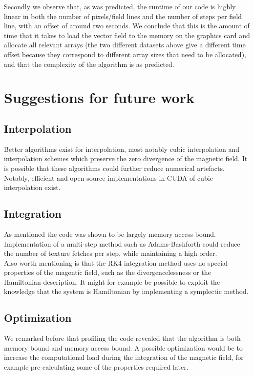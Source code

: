 \documentclass{article}
\begin{document}
Secondly we observe that, as was predicted, the runtime of our code is highly linear in both the number of pixels/field lines and the number of steps per field line, with an offset of around two seconds. 
We conclude that this is the amount of time that it takes to load the vector field to the memory on the graphics card and allocate all relevant arrays (the two different datasets above give a different time offset because they correspond to different array sizes that need to be allocated), and that the complexity of the algorithm is as predicted.

\section{Suggestions for future work}

\subsection{Interpolation}
Better algorithms exist for interpolation, most notably cubic interpolation and interpolation schemes which preserve the zero divergence of the magnetic field\cite{McNally01052011}. It is possible that these algorithms could further reduce numerical artefacts. %
Notably, efficient and open source implementations in CUDA of cubic interpolation exist.\cite{Ruijters01012012}

\subsection{Integration}
As mentioned the code was shown to be largely memory access bound. Implementation of a multi-step method such as Adams-Bashforth could reduce the number of texture fetches per step, while maintaining a high order.\\
Also worth mentioning is that the RK4 integration method uses no special properties of the magentic field, such as the divergencelessness or the Hamiltonian description. It might for example be possible to exploit the knowledge that the system is Hamiltonian by implementing a symplectic method.

\subsection{Optimization}
We remarked before that profiling the code revealed that the algorithm is both memory bound and memory access bound. 
A possible optimization would be to increase the computational load during the integration of the magnetic field, for example pre-calculating some of the properties required later.





\end{document}
